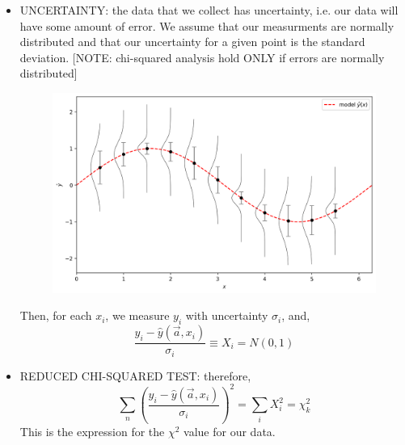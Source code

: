 \documentclass[12pt]{article}
\numberwithin{equation}{section}
\begin{document}
\begin{itemize}
\item UNCERTAINTY: the data that we collect has uncertainty, i.e. our data will have some amount of error. We assume that our measurments are normally distributed and that our uncertainty for a given point is the standard deviation. [NOTE: chi-squared analysis hold ONLY if errors are normally distributed]
\begin{figure}[H]
	\centering
	\includegraphics[width=12cm] {model}
\end{figure}
Then, for each $ x_i $, we measure $ y_i $ with uncertainty $ \sigma_i $, and,
\begin{equation}
	\frac{y_i - \hat{y}(\vec{a}, x_i) }{\sigma_i} \equiv X_i = N(0,1) 
\end{equation}

\item REDUCED CHI-SQUARED TEST: therefore,
\begin{equation}
	\sum_n 	\left(\frac{y_i - \hat{y}(\vec{a}, x_i) }{\sigma_i}\right)^2 = \sum_i X_i^2 = \chi^2_k
\end{equation}
This is the expression for the $ \chi^2 $ value for our data.


\end{itemize}
\end{document}
